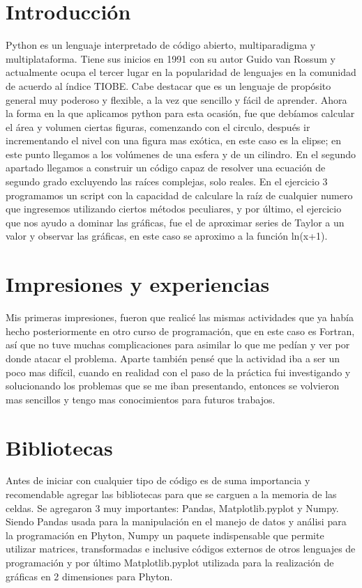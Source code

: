 ﻿\documentclass[12pt]{article}
\begin{document}
\section{Introducción}
 Python es un lenguaje interpretado de código abierto, multiparadigma y multiplataforma. Tiene sus inicios en 1991 con su autor Guido van Rossum y actualmente ocupa el tercer lugar en la popularidad de lenguajes en la comunidad de acuerdo al índice TIOBE. Cabe destacar que es un lenguaje de propósito general muy poderoso y flexible, a la vez que sencillo y fácil de aprender. Ahora la forma en la que aplicamos python para esta ocasión, fue que debíamos calcular el área y volumen ciertas figuras, comenzando con el circulo, después ir incrementando el nivel con una figura mas exótica, en este caso es la elipse; en este punto llegamos a los volúmenes de una esfera y de un cilindro. En el segundo apartado llegamos a construir un código capaz de resolver una ecuación de segundo grado excluyendo las raíces complejas, solo reales. En el ejercicio 3 programamos un script con la capacidad de calculare la raíz de cualquier numero que ingresemos utilizando ciertos métodos peculiares, y por último, el ejercicio que nos ayudo a dominar las gráficas, fue el de aproximar series de Taylor a un valor y observar las gráficas, en este caso se aproximo a la función ln(x+1). 

\section{Impresiones y experiencias}
	Mis primeras impresiones, fueron que realicé las mismas actividades que ya había hecho posteriormente en otro curso de programación, que en este caso es Fortran, así que no tuve muchas complicaciones para asimilar lo que me pedían y ver por donde atacar el problema. Aparte también pensé que la actividad iba a ser un poco mas difícil, cuando en realidad con el paso de la práctica fui investigando y solucionando los problemas que se me iban presentando, entonces se volvieron mas sencillos y tengo mas conocimientos para futuros trabajos.
	
\section{Bibliotecas}
Antes de iniciar con cualquier tipo de código es de suma importancia y recomendable agregar las bibliotecas para que se carguen a la memoria de las celdas. Se agregaron 3 muy importantes: Pandas, Matplotlib.pyplot y Numpy. Siendo Pandas usada para la manipulación en el manejo de datos y análisi para la programación en Phyton, Numpy un paquete indispensable que permite utilizar matrices, transformadas e inclusive códigos externos de otros lenguajes de programación y por último Matplotlib.pyplot utilizada para la realización de gráficas en 2 dimensiones para Phyton.\\
\end{document}

